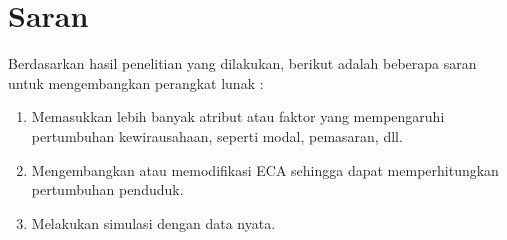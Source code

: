\section{Saran}
Berdasarkan hasil penelitian yang dilakukan, berikut adalah beberapa saran untuk mengembangkan perangkat lunak :
\begin{enumerate}
	\item Memasukkan lebih banyak atribut atau faktor yang mempengaruhi pertumbuhan kewirausahaan, seperti modal, pemasaran, dll.
	\item Mengembangkan atau memodifikasi ECA sehingga dapat memperhitungkan pertumbuhan penduduk.
	\item Melakukan simulasi dengan data nyata.
\end{enumerate}